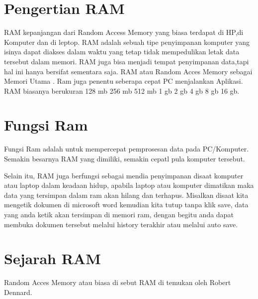 \section{Pengertian RAM}
RAM kepanjangan dari Random Access Memory yang biasa terdapat di HP,di Komputer dan di leptop.
RAM adalah sebuah tipe penyimpanan komputer yang isinya dapat diakses dalam waktu yang tetap tidak mempedulikan letak data tersebut dalam memori.
RAM juga bisa menjadi tempat penyimpanan data,tapi hal ini hanya bersifat sementara saja.
RAM atau Random Acces Memory sebagai Memori Utama . Ram juga penentu seberapa cepat PC menjalankan Aplikasi.
RAM biasanya berukuran 128 mb 256 mb 512 mb 1 gb 2 gb 4 gb 8 gb 16 gb.

\section{Fungsi Ram}

Fungsi Ram adalah untuk mempercepat pemprosesan data pada PC/Komputer. 
Semakin besarnya RAM yang dimiliki, 
semakin cepatl pula komputer tersebut.

Selain itu, RAM juga berfungsi sebagai mendia penyimpanan disaat komputer atau laptop dalam keadaan hidup, 
apabila laptop atau komputer dimatikan maka data yang tersimpan dalam ram akan hilang dan terhapus. 
Misalkan disaat kita mengetik dokumen di microsoft word kemudian kita tutup tanpa klik save, 
data yang anda ketik akan tersimpan di memori ram, dengan begitu anda dapat membuka dokumen tersebut melalui history terakhir atau melalui auto save.

\section{Sejarah RAM}
Random Acces Memory atau biasa di sebut RAM di temukan oleh Robert Dennard.